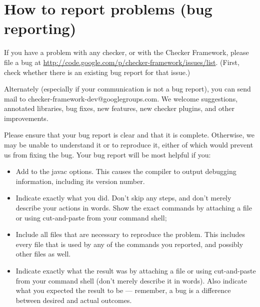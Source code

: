 % 
% 
% 
% 
% 
% 


\section{How to report problems (bug reporting)\label{reporting-bugs}}

If you have a problem with any checker, or with the Checker Framework,
please file a bug at 
\url{http://code.google.com/p/checker-framework/issues/list}.
(First, check whether there is an existing bug report for that issue.)

Alternately (especially if your communication is not a bug report), you can
send mail to checker-framework-dev@googlegroups.com.
We welcome suggestions, annotated libraries, bug fixes, new
features, new checker plugins, and other improvements.

Please ensure that your bug report is clear and that it is complete.
Otherwise, we may be unable to understand it or to reproduce it, either of
which would prevent us from fixing the bug.  Your bug report will be most
helpful if you:

\begin{itemize}
\item
  Add  to the javac options.  This causes the compiler to output
  debugging information, including its version number.
\item
  Indicate exactly what you did.  Don't skip any steps, and don't merely
  describe your actions in words.  Show the exact commands by attaching a
  file or using cut-and-paste from your command shell;
\item
  Include all files that are necessary to reproduce the problem.  This
  includes every file that is used by any of the commands you reported, and
  possibly other files as well.
\item
  Indicate exactly what the result was by attaching a file or using
  cut-and-paste from your command shell (don't merely describe it in
  words).  Also indicate what you expected the result to be --- remember, a
  bug is a difference between desired and actual outcomes.
\end{itemize}

